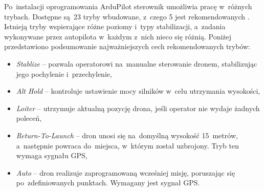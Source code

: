 Po~instalacji oprogramowania ArduPilot sterownik umożliwia pracę w~różnych trybach. 
Dostępne są~23 tryby wbudowane, z~czego 5 jest rekomendowanych \cite{pixhawk_modes}. 
Istnieją tryby wspierające różne poziomy i~typy stabilizacji, a~zadania wykonywane przez autopilota w~każdym z~nich nieco się różnią. 
Poniżej przedstawiono podsumowanie najważniejszych cech rekomendowanych trybów:
\begin{itemize}
	\item \textit{Stablize} -- pozwala operatorowi na~manualne sterowanie dronem, stabilizując jego pochylenie i~przechylenie,
	\item \textit{Alt Hold} -- kontroluje ustawienie mocy silników w~celu utrzymania wysokości,
	\item \textit{Loiter} --  utrzymuje aktualną pozycję drona, jeśli operator nie wydaje żadnych poleceń,
	\item \textit{Return-To-Launch} --  dron unosi się na~domyślną wysokość 15~metrów, a~następnie powraca do~miejsca, w~którym został uzbrojony. Tryb ten wymaga sygnału GPS,
	\item \textit{Auto} --  dron realizuje zaprogramowaną wcześniej misję, poruszając się po~zdefiniowanych punktach. Wymagany jest sygnał GPS.
\end{itemize}

